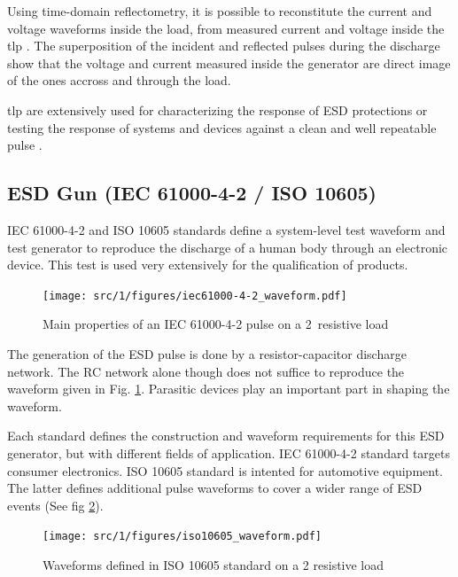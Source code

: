 Using time-domain reflectometry, it is possible to reconstitute the current and voltage waveforms inside the load,
from measured current and voltage inside the \gls{tlp} \cite{TLP}.
The superposition of the incident and reflected pulses during the discharge show that the voltage and current
measured inside the generator are direct image of the ones accross and through the load.

\gls{tlp} are extensively used for characterizing the response of ESD protections \cite{TLPforESDProtectionCz}
or testing the response of systems and devices against a clean and well repeatable pulse \cite{TLPthroubleshooting, LacrampeTransientImmunity}.


\subsection{ESD Gun (IEC 61000-4-2 / ISO 10605)}

IEC 61000-4-2 and ISO 10605 standards define a system-level test waveform and test generator to reproduce the discharge of a human body through an electronic device.
This test is used very extensively for the qualification of products.

\begin{figure}[!h]
  \centering
  \texttt{[image: src/1/figures/iec61000-4-2\_waveform.pdf]}
  \caption{Main properties of an IEC 61000-4-2 pulse on a 2\textOmega\ resistive load}
  \label{iec_pulse}
\end{figure}

The generation of the ESD pulse is done by a resistor-capacitor discharge network.
The RC network alone though does not suffice to reproduce the waveform given in Fig. \ref{iec_pulse}.
Parasitic devices play an important part in shaping the waveform.

Each standard defines the construction and waveform requirements for this ESD generator, but with different fields of application.
IEC 61000-4-2\cite{iec61000-4-2} standard targets consumer electronics.
ISO 10605\cite{iso10605} standard is intented for automotive equipment.
The latter defines additional pulse waveforms to cover a wider range of ESD events (See fig \ref{iso_pulse}).

\begin{figure}[!h]
  \centering
  \texttt{[image: src/1/figures/iso10605\_waveform.pdf]}
  \caption{Waveforms defined in ISO 10605 standard on a 2\textOmega{} resistive load}
  \label{iso_pulse}
\end{figure}

